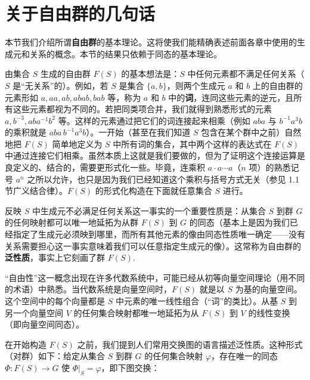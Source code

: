 \section{关于自由群的几句话}

本节我们介绍所谓\textbf{自由群}的基本理论。这将使我们能精确表述前面各章中使用的生成元和关系的概念。本节的结果只依赖于同态的基本理论。

由集合 \(S\) 生成的自由群 \(F(S)\) 的基本想法是：\(S\) 中任何元素都不满足任何关系（\(S\) 是“无关系”的）。例如，若 \(S\) 是集合 \(\{a, b\}\)，则两个生成元 \(a\) 和 \(b\) 上的自由群的元素形如 \(a, aa, ab, abab, bab\) 等，称为 \(a\) 和 \(b\) 中的\textbf{词}，连同这些元素的逆元，且所有这些元素都视为不同的。若把同类项合并，我们就得到熟悉形式的元素 \(a, b^{-3}, aba^{-1}b^2\) 等。这样的元素通过把它们的词连接起来相乘（例如 \(aba\) 与 \(b^{-1}a^3b\) 的乘积就是 \(aba\,b^{-1}a^3b\)）。一开始（甚至在我们知道 \(S\) 包含在某个群中之前）自然地把 \(F(S)\) 简单地定义为 \(S\) 中所有词的集合，其中两个这样的表达式在 \(F(S)\) 中通过连接它们相乘。虽然本质上这就是我们要做的，但为了证明这个连接运算是良定义的、结合的，需要更形式化一些。毕竟，连乘积 \(a \cdot a \cdots a\)（\(n\) 项）的熟悉记号 \(a^n\) 之所以允许，也只是因为我们已经知道这个乘积与括号方式无关（参见 1.1 节广义结合律）。\(F(S)\) 的形式化构造在下面就任意集合 \(S\) 进行。

反映 \(S\) 中生成元不必满足任何关系这一事实的一个重要性质是：从集合 \(S\) 到群 \(G\) 的任何映射都可以唯一地延拓为从群 \(F(S)\) 到 \(G\) 的同态（基本上是因为我们已经指定了生成元必须映到哪里，而所有其他元素的像由同态性质唯一确定——没有关系需要担心这一事实意味着我们可以任意指定生成元的像）。这常称为自由群的\textbf{泛性质}，事实上它刻画了群 \(F(S)\).

“自由性”这一概念出现在许多代数系统中，可能已经从初等向量空间理论（用不同的术语）中熟悉。当代数系统是向量空间时，\(F(S)\) 就是以 \(S\) 为基的向量空间。这个空间中的每个向量都是 \(S\) 中元素的唯一线性组合（“词”的类比）。从基 \(S\) 到另一个向量空间 \(V\) 的任何集合映射都唯一地延拓为从 \(F(S)\) 到 \(V\) 的线性变换（即向量空间同态）。

在开始构造 \(F(S)\) 之前，我们提到人们常用交换图的语言描述泛性质。这种形式（对群）如下：给定从集合 \(S\) 到群 \(G\) 的任何集合映射 \(\varphi\)，存在唯一的同态 \(\Phi : F(S) \to G\) 使 \(\Phi|_S = \varphi\)，即下图交换：

\begin{center}
\end{center}

